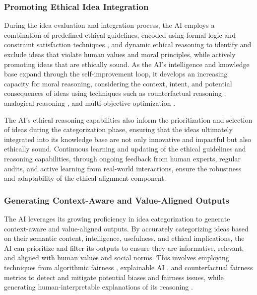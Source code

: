 \documentclass[conference]{article}
\begin{document}
	\subsubsection{Promoting Ethical Idea Integration}
	During the idea evaluation and integration process, the AI employs a combination of predefined ethical guidelines, encoded using formal logic and constraint satisfaction techniques \cite{rossi2006handbook}, and dynamic ethical reasoning to identify and exclude ideas that violate human values and moral principles, while actively promoting ideas that are ethically sound. As the AI's intelligence and knowledge base expand through the self-improvement loop, it develops an increasing capacity for moral reasoning, considering the context, intent, and potential consequences of ideas using techniques such as counterfactual reasoning \cite{perez2019counterfactual}, analogical reasoning \cite{dehghani2008analogical}, and multi-objective optimization \cite{noothigattu2018interpretable}.
	
	The AI's ethical reasoning capabilities also inform the prioritization and selection of ideas during the categorization phase, ensuring that the ideas ultimately integrated into its knowledge base are not only innovative and impactful but also ethically sound. Continuous learning and updating of the ethical guidelines and reasoning capabilities, through ongoing feedback from human experts, regular audits, and active learning from real-world interactions, ensure the robustness and adaptability of the ethical alignment component.
	
	\subsubsection{Generating Context-Aware and Value-Aligned Outputs}
	The AI leverages its growing proficiency in idea categorization to generate context-aware and value-aligned outputs. By accurately categorizing ideas based on their semantic content, intelligence, usefulness, and ethical implications, the AI can prioritize and filter its outputs to ensure they are informative, relevant, and aligned with human values and social norms. This involves employing techniques from algorithmic fairness \cite{mehrabi2021survey}, explainable AI \cite{adadi2018peeking}, and counterfactual fairness metrics \cite{kusner2017counterfactual} to detect and mitigate potential biases and fairness issues, while generating human-interpretable explanations of its reasoning \cite{wachter2018explanations}.
	
\end{document}
